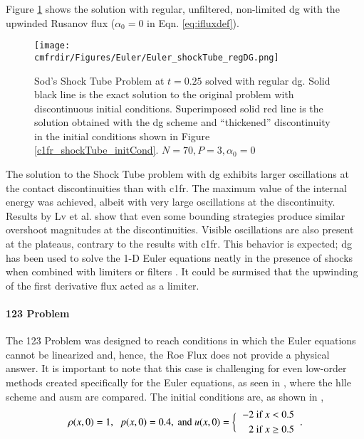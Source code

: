 Figure \ref{c1fr_shockTube_regDG} shows the solution with regular, unfiltered, non-limited \gls{dg} with the upwinded Rusanov flux ($\alpha_0 = 0$ in Eqn. \eqref{eq:ifluxdef}).

\begin{figure}
\centering
\hspace{-1.25 cm}
\centering\texttt{[image: \\cmfrdir/Figures/Euler/Euler\_shockTube\_regDG.png]}
  \caption{Sod's Shock Tube Problem at $t = 0.25$ solved with regular \gls{dg}. Solid black line is the exact solution to the original problem with discontinuous initial conditions. Superimposed solid red line is the solution obtained with the \gls{dg} scheme and ``thickened'' discontinuity in the initial conditions shown in Figure \ref{c1fr_shockTube_initCond}. $N=70, P=3, \alpha_0=0$}
  \label{c1fr_shockTube_regDG}
\end{figure}

The solution to the Shock Tube problem with \gls{dg} exhibits larger oscillations at the contact discontinuities than with \gls{c1fr}. The maximum value of the internal energy was achieved, albeit with very large oscillations at the discontinuity. Results by Lv et al. \cite{lv2015entropy} show that even some bounding strategies produce similar overshoot magnitudes at the discontinuities. Visible oscillations are also present at the plateaus, contrary to the results with \gls{c1fr}. This behavior is expected; \gls{dg} has been used to solve the 1-D Euler equations neatly in the presence of shocks when combined with limiters \cite{wang2015arbitrary} or filters \cite{asthana2014}. It could be surmised that the upwinding of the first derivative flux acted as a limiter.

\paragraph{123 Problem}
The 123 Problem was designed to reach conditions in which the Euler equations cannot be linearized and, hence, the Roe Flux does not provide a physical answer. It is important to note that this case is challenging for even low-order methods created specifically for the Euler equations, as seen in \cite{hudson2006review}, where the \gls{hlle} scheme \cite{einfeldt1988godunov} and \gls{ausm} \cite{liou1996sequel} are compared.
The initial conditions are, as shown in \cite{einfeldt1991godunov},
\begin{equation*}
\rho(x,0) = 1,\;\;
p(x,0) = 0.4
,\text{ and } u(x,0) = \bigg\{
\begin{tabular}{c}
$
\begin{aligned}
-2 &\text{ if } x < 0.5\\
2 &\text{ if } x \ge 0.5
\end{aligned}
$
\end{tabular}.
\end{equation*}

